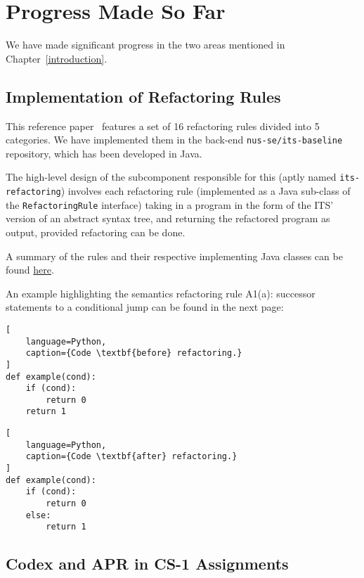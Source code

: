 \chapter{Progress Made So Far}
We have made significant progress in the two areas mentioned in Chapter~\ref{introduction}.

\section{Implementation of Refactoring Rules}

This reference paper~\cite{hu2019re} features a set of 16 refactoring rules divided into 5 categories.
We have implemented them in the back-end
\texttt{nus-se/its-baseline} repository,
which has been developed in Java.

The high-level design of the subcomponent responsible for this (aptly named \texttt{its-refactoring})
involves each refactoring rule (implemented as a Java sub-class of the \texttt{RefactoringRule} interface)
taking in a program in the form of the ITS' version of an abstract syntax tree, and returning the
refactored program as output, provided refactoring can be done.

A summary of the rules and their respective implementing Java classes can be found
\href{https://docs.google.com/document/d/1MnEVEUaiQ1A2MWca_qPiktKZdP6hV-1CLTXcWwK6PyE/edit}{here}.

An example highlighting the semantics refactoring rule A1(a): successor statements to a
conditional jump can be found in the next page:

\pagebreak

\begin{multicols}{2}
\begin{lstlisting}[
    language=Python,
    caption={Code \textbf{before} refactoring.}
]
def example(cond):
    if (cond):
        return 0
    return 1
\end{lstlisting}

\columnbreak

\begin{lstlisting}[
    language=Python,
    caption={Code \textbf{after} refactoring.}
]
def example(cond):
    if (cond):
        return 0
    else:
        return 1
\end{lstlisting}
\end{multicols}

\section{Codex and APR in CS-1 Assignments}

